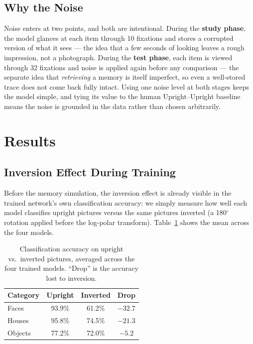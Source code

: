 \documentclass[11pt]{article}
\begin{document}
\subsection{Why the Noise}

Noise enters at two points, and both are intentional. During the \textbf{study phase}, the
model glances at each item through 10 fixations and stores a corrupted version of what it
sees --- the idea that a few seconds of looking leaves a rough impression, not a photograph.
During the \textbf{test phase}, each item is viewed through 32 fixations and noise is applied
again before any comparison --- the separate idea that \emph{retrieving} a memory is itself
imperfect, so even a well-stored trace does not come back fully intact. Using one noise level
at both stages keeps the model simple, and tying its value to the human Upright--Upright
baseline means the noise is grounded in the data rather than chosen arbitrarily.

\section{Results}

\subsection{Inversion Effect During Training}

Before the memory simulation, the inversion effect is already visible in the trained
network's own classification accuracy: we simply measure how well each model classifies
upright pictures versus the same pictures inverted (a 180$^\circ$ rotation applied before the
log-polar transform). Table~\ref{tab:train} shows the mean across the four models.

\begin{table}[h]
\centering
\caption{Classification accuracy on upright vs.\ inverted pictures, averaged across the four
trained models. ``Drop'' is the accuracy lost to inversion.}
\label{tab:train}
\begin{tabular}{lccc}
\toprule
Category & Upright & Inverted & Drop \\
\midrule
Faces   & 93.9\% & 61.2\% & $-32.7$ \\
Houses  & 95.8\% & 74.5\% & $-21.3$ \\
Objects & 77.2\% & 72.0\% & $-5.2$ \\
\bottomrule
\end{tabular}
\end{table}
\end{document}
